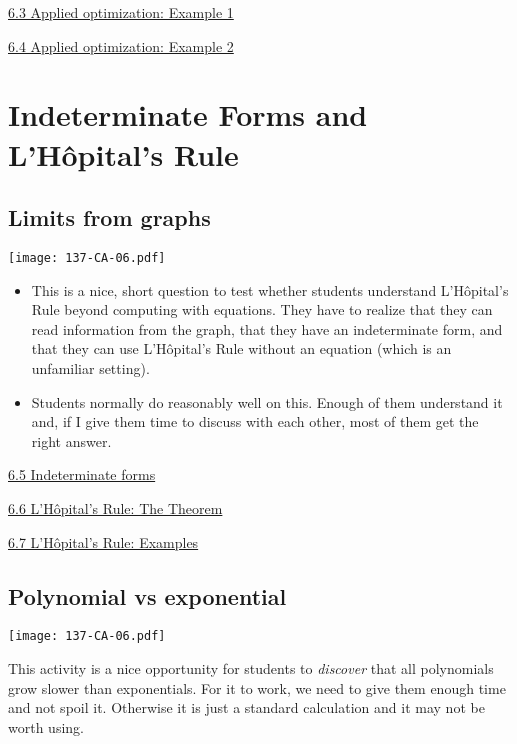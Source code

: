 \documentclass[11pt]{article}
\newcommand{\nl}{\hfill \vspace{-1.1\baselineskip}} %
\newcommand{\viii}{\hspace{8mm} \href{https://www.youtube.com/watch?v=AuWxVJPU0SI&list=PLlwePzQY_wW9EsqbQzPdJTNGsHYvO_2CJ&index=3}{6.3 Applied optimization: Example 1
}}
\newcommand{\viv}{\hspace{8mm} \href{https://www.youtube.com/watch?v=SaeGMaz0w5g&list=PLlwePzQY_wW9EsqbQzPdJTNGsHYvO_2CJ&index=4}{6.4 Applied optimization: Example 2}}
\newcommand{\vv}{\hspace{8mm} \href{https://www.youtube.com/watch?v=yz8uZbi2wEk&list=PLlwePzQY_wW9EsqbQzPdJTNGsHYvO_2CJ&index=5}{6.5 Indeterminate forms}}
\newcommand{\vvi}{\hspace{8mm} \href{https://www.youtube.com/watch?v=6YvN79aDbjs&list=PLlwePzQY_wW9EsqbQzPdJTNGsHYvO_2CJ&index=6}{6.6 L'Hôpital's Rule: The Theorem}}
\newcommand{\vvii}{\hspace{8mm} \href{https://www.youtube.com/watch?v=aaee9hSP7Gw&list=PLlwePzQY_wW9EsqbQzPdJTNGsHYvO_2CJ&index=7}{6.7 L'Hôpital's Rule: Examples}}
\begin{document}
\begin{videos}
\viii

\viv
\end{videos}

\newpage
\section{Indeterminate Forms and L'H\^opital's Rule}
\subsection{Limits from graphs}

\begin{center}
{ \texttt{[image: 137-CA-06.pdf]}} 
\end{center}


\begin{comments}
\nl
	\begin{itemize}
		\item This is a nice, short question to test whether students understand L'H\^{o}pital's Rule beyond computing with equations.  They have to realize that they can read information from the graph, that they have an indeterminate form, and that they can use L'H\^{o}pital's Rule without an equation (which is an unfamiliar setting).
		\item Students normally do reasonably well on this.  Enough of them understand it and, if I give them time to discuss with each other, most of them get the right answer.
	\end{itemize}
\end{comments}

\begin{videos}
\vv

\vvi

\vvii
\end{videos}

\newpage
\subsection{Polynomial vs exponential}

\begin{center}
{ \texttt{[image: 137-CA-06.pdf]}} 
\end{center}

\begin{warning}
This activity is a nice opportunity for students to \emph{discover} that all polynomials grow slower than exponentials.  For it to work, we need to give them enough time and not spoil it.  Otherwise it is just a standard calculation and it may not be worth using.
\end{warning}
\end{document}
